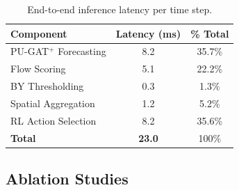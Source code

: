 \documentclass{article}
\theoremstyle{plain}
\theoremstyle{definition}
\theoremstyle{remark}
\begin{document}
\label{sec:runtime}

\begin{table}[t]
\centering
\caption{End-to-end inference latency per time step.}
\label{tab:runtime}
\begin{tabular}{lcc}
\toprule
\textbf{Component} & \textbf{Latency (ms)} & \textbf{\% Total} \\
\midrule
PU-GAT$^+$ Forecasting & 8.2 & 35.7\% \\
Flow Scoring & 5.1 & 22.2\% \\
BY Thresholding & 0.3 & 1.3\% \\
Spatial Aggregation & 1.2 & 5.2\% \\
RL Action Selection & 8.2 & 35.6\% \\
\midrule
\textbf{Total} & \textbf{23.0} & 100\% \\
\bottomrule
\end{tabular}
\end{table}


\subsection{Ablation Studies}
\label{sec:ablation}
\end{document}
